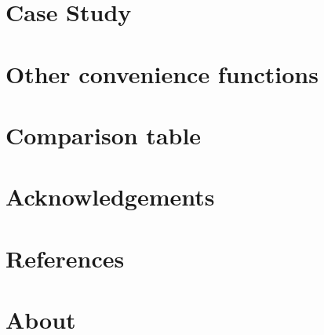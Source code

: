\documentclass[article]{jss}
\begin{document}
\section{Case Study}
\section{Other convenience functions}
\section{Comparison table}
\section*{Acknowledgements}
\section*{References}


\section[About Java]{About }
\end{document}

